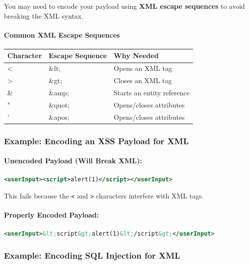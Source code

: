 \documentclass{article}
\begin{document}
\begin{warningbox}
You may need to encode your payload using \textbf{XML escape sequences} to avoid breaking the XML syntax.
\end{warningbox}

\paragraph{Common XML Escape Sequences}

\begin{table}[h]
\centering
\begin{tabular}{|l|l|l|}
\hline
\textbf{Character} & \textbf{Escape Sequence} & \textbf{Why Needed} \\
\hline
< & \&lt; & Opens an XML tag \\
\hline
> & \&gt; & Closes an XML tag \\
\hline
\& & \&amp; & Starts an entity reference \\
\hline
" & \&quot; & Opens/closes attributes \\
\hline
' & \&apos; & Opens/closes attributes \\
\hline
\end{tabular}
\end{table}

\subsubsection{Example: Encoding an XSS Payload for XML}

\paragraph{Unencoded Payload (Will Break XML):}
\begin{lstlisting}[language=XML]
<userInput><script>alert(1)</script></userInput>
\end{lstlisting}
This fails because the \texttt{<} and \texttt{>} characters interfere with XML tags.

\paragraph{Properly Encoded Payload:}
\begin{lstlisting}[language=XML]
<userInput>&lt;script&gt;alert(1)&lt;/script&gt;</userInput>
\end{lstlisting}

\subsubsection{Example: Encoding SQL Injection for XML}
\end{document}
